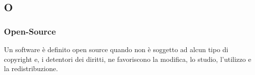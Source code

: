 \subsection*{\textbf{\hfill \Huge{O} \hfill}} 
\subsubsection*{Open-Source}
Un software è definito open source quando non è soggetto ad alcun tipo di copyright e, i detentori dei diritti, ne favoriscono la modifica, lo studio, l'utilizzo e la redistribuzione.